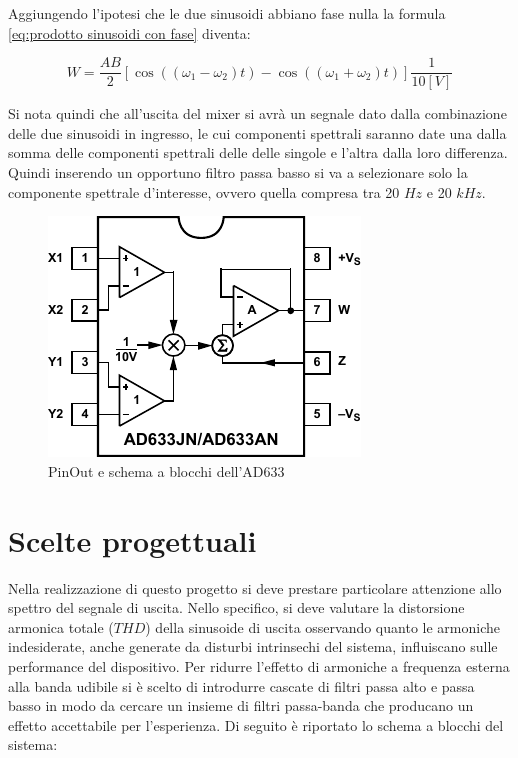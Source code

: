 \documentclass[titlepage]{report}
\begin{document}
	Aggiungendo l'ipotesi che le due sinusoidi abbiano fase nulla la formula \ref*{eq:prodotto sinusoidi con fase} diventa:


	\begin{equation}
		\label{eq:prodotto sinusoidi}
		W = \frac{AB}{2}[\cos ((\omega _1 - \omega _2)t) - \cos ((\omega _1 +\omega _2)t)]\frac{1}{10[V]} 
	\end{equation}
	

	Si nota quindi che all'uscita del mixer si avrà un segnale dato dalla combinazione delle due sinusoidi in ingresso, le cui componenti spettrali saranno date una dalla somma delle componenti spettrali delle delle singole e l'altra dalla loro differenza.
	Quindi inserendo un opportuno filtro passa basso si va a selezionare solo la componente spettrale d'interesse, ovvero quella compresa tra 20 $Hz$ e 20 $kHz$.

	
	\begin{figure}[H]
		\centering
		\includegraphics{Immagini/ad633_pinout.pdf}
		\caption{PinOut e schema a blocchi dell'AD633}
		\label{fig: AD633 schema a blocchi}
	\end{figure}


\chapter{Scelte progettuali}
	\label{ch:scelte}
	
	Nella realizzazione di questo progetto si deve prestare particolare attenzione allo spettro del segnale di uscita. Nello specifico, si deve valutare la distorsione armonica totale ($THD$) della sinusoide di uscita osservando quanto le armoniche indesiderate, anche generate da disturbi intrinsechi del sistema, influiscano sulle performance del dispositivo.
	Per ridurre l'effetto di armoniche a frequenza esterna alla banda udibile si è scelto di introdurre cascate di filtri passa alto e passa basso in modo da cercare un insieme di filtri passa-banda che producano un effetto accettabile per l'esperienza. Di seguito è riportato lo schema a blocchi del sistema:
\end{document}
